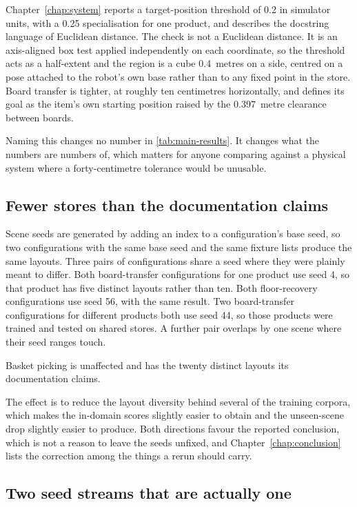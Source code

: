 Chapter~\ref{chap:system} reports a target-position threshold of 0.2 in simulator units, with a 0.25 specialisation for one product, and describes the docstring language of Euclidean distance. The check is not a Euclidean distance. It is an axis-aligned box test applied independently on each coordinate, so the threshold acts as a half-extent and the region is a cube 0.4~metres on a side, centred on a pose attached to the robot's own base rather than to any fixed point in the store. Board transfer is tighter, at roughly ten centimetres horizontally, and defines its goal as the item's own starting position raised by the 0.397~metre clearance between boards.

Naming this changes no number in \ref{tab:main-results}. It changes what the numbers are numbers of, which matters for anyone comparing against a physical system where a forty-centimetre tolerance would be unusable.

\subsection*{Fewer stores than the documentation claims}

Scene seeds are generated by adding an index to a configuration's base seed, so two configurations with the same base seed and the same fixture lists produce the same layouts. Three pairs of configurations share a seed where they were plainly meant to differ. Both board-transfer configurations for one product use seed 4, so that product has five distinct layouts rather than ten. Both floor-recovery configurations use seed 56, with the same result. Two board-transfer configurations for different products both use seed 44, so those products were trained and tested on shared stores. A further pair overlaps by one scene where their seed ranges touch.

Basket picking is unaffected and has the twenty distinct layouts its documentation claims.

The effect is to reduce the layout diversity behind several of the training corpora, which makes the in-domain scores slightly easier to obtain and the unseen-scene drop slightly easier to produce. Both directions favour the reported conclusion, which is not a reason to leave the seeds unfixed, and Chapter~\ref{chap:conclusion} lists the correction among the things a rerun should carry.

\subsection*{Two seed streams that are actually one}

